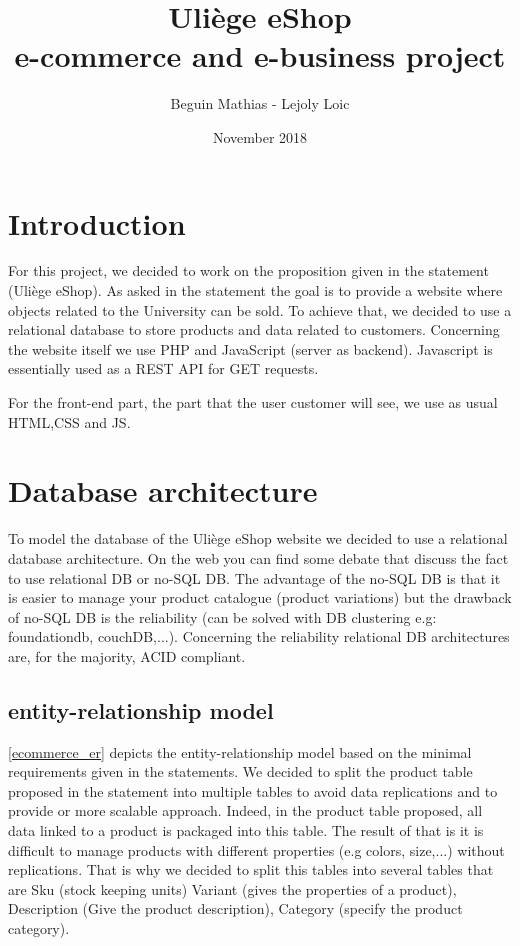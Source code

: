 \documentclass{article}
\title{Uliège eShop \\e-commerce and e-business project}
\author{Beguin Mathias - Lejoly Loic}
\date{November 2018}
\begin{document}
\maketitle

\section{Introduction}
For this project, we decided to work on the proposition given in the statement (Uliège eShop). As asked in the statement the goal is to provide a website where objects related to the University can be sold. To achieve that, we decided to use a relational database to store products and data related to customers. Concerning the website itself we use PHP and JavaScript (server as backend). Javascript is essentially used as a REST API for GET requests.

For the front-end part, the part that the user customer will see, we use as usual HTML,CSS and JS.

\section{Database architecture}
To model the database of the Uliège eShop website we decided to use a relational database architecture. On the web you can find some debate that discuss the fact to use relational DB or no-SQL DB. The advantage of the no-SQL DB is that it is easier to manage your product catalogue (product variations) but the drawback of no-SQL DB is the reliability (can be solved with DB clustering e.g: foundationdb, couchDB,...). Concerning the reliability relational DB architectures are, for the majority, ACID compliant. 

\subsection{entity-relationship model}
\autoref{ecommerce_er} depicts the entity-relationship model based on the minimal requirements given in the statements. We decided to split the product table proposed in the statement into multiple tables to avoid data replications and to provide or more scalable approach. Indeed, in the product table proposed, all data linked to a product is packaged into this table. The result of that is it is difficult to manage products with different properties (e.g colors, size,...) without replications. That is why we decided to split this tables into several tables that are Sku (stock keeping units) Variant (gives the properties of a product), Description (Give the product description), Category (specify the product category). \\
\end{document}

